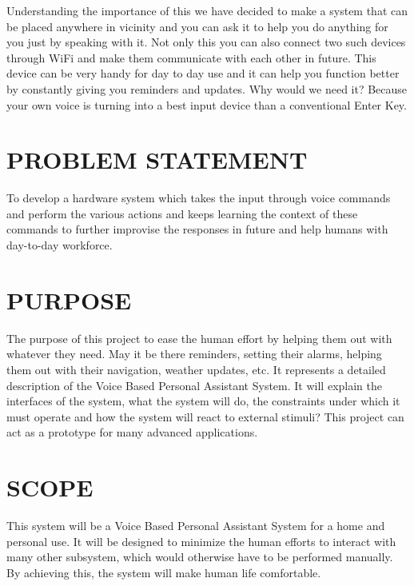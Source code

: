 \documentclass[12pt]{extreport}
\begin{document}
\noindent
Understanding the importance of this we have decided to make a system that can be placed anywhere in vicinity and you can ask it to help you do anything for you just by speaking with it. Not only this you can also connect two such devices through WiFi and make them communicate with each other in future. This device can be very handy for day to day use and it can help you function better by constantly giving you reminders and updates. 
Why would we need it? Because your own voice is turning into a best input device than a conventional Enter Key.\\

\section{PROBLEM STATEMENT}
\noindent
To develop a hardware system which takes the input through voice commands and perform the various actions and keeps learning the context of these commands to further improvise the responses in future and help humans with day-to-day workforce.\\



\section{PURPOSE}
\noindent
The purpose of this project to ease the human effort by helping them out with whatever they need. May it be there reminders, setting their alarms, helping them out with their navigation, weather updates, etc. It represents a detailed description of the Voice Based Personal Assistant System. It will explain the interfaces of the system, what the system will do, the constraints under which it must operate and how the system will react to external stimuli? This project can act as a prototype for many advanced applications.\\


\section{SCOPE}
\hspace{3em}
This system will be a Voice Based Personal Assistant System for a home and personal use. It will be designed to minimize the human efforts to interact with many other subsystem, which would otherwise have to be performed manually. By achieving this, the system will make human life comfortable.\\
\end{document}
